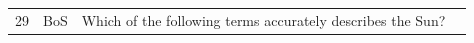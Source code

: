 \documentclass[10pt]{article}
\begin{document}
\begin{tiny}
\begin{longtable}{r p{0.3in} p{1.212in} p{3.8in}}
    29 &          BoS &                                                                                                                                                                                                                       Which of the following terms accurately describes the Sun? &                                                                                                                                                                                                                                                                                                                                                                                                                                                                                                                                                                                                                                                                                                                                                                                                                                                                                                                                                                                                                                                                                                                                                                                                                                                                                                                                                                                                                                                                                                                                                                                                                                                                                                                                                                                                                                                                                                                                                                                                                                                                                                                                                                                                                                                                                                                                                                                                                                                                                                                                                                                                                                                                                                                                                                                                                                                                                                                                                                                                                                                                                               
\end{longtable}
\end{tiny}
\end{document}
